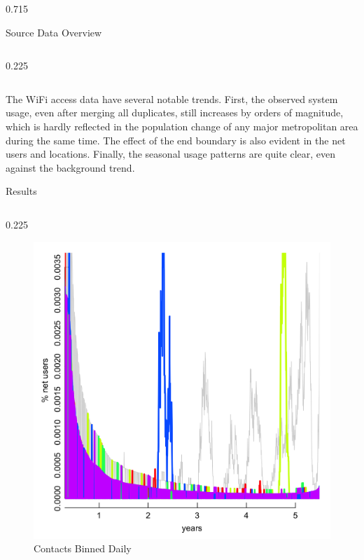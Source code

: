 \documentclass[final]{beamer} %
\newenvironment{oneCol}{\begin{column}[t]{0.225\paperwidth}}{\end{column}}
\newenvironment{threeCol}{\begin{column}[t]{0.715\paperwidth}}{\end{column}}
\begin{document}
\begin{frame}{}
\begin{columns}[t]
\begin{threeCol}
\begin{block}{Source Data Overview}
\begin{columns}
\begin{oneCol}
\begin{figure}
      \end{figure}   
    \end{oneCol}
    \end{columns}
    The WiFi access data have several notable trends.  First, the observed system usage, even after merging all duplicates, still increases by orders of magnitude, which is hardly reflected in the population change of any major metropolitan area during the same time.  The effect of the end boundary is also evident in the net users and locations.  Finally, the seasonal usage patterns are quite clear, even against the background trend. 
    \end{block}
    
    \begin{block}{Results}
    \begin{columns}
    \begin{oneCol}
      \begin{figure}
        \caption{Contacts Binned Daily}
        \includegraphics[width=1.0\linewidth]{out1.png}
      \end{figure}
      \begin{figure}

\end{figure}
\end{oneCol}
\end{columns}
\end{block}
\end{threeCol}
\end{columns}
\end{frame}
\end{document}
